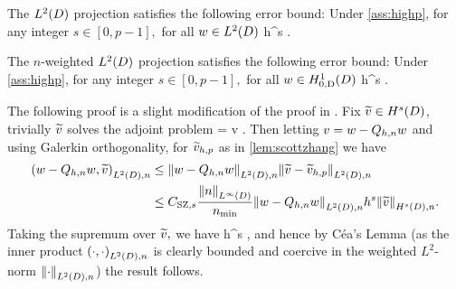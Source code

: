 




The $\LtD$ projection satisfies the following error bound:
\label{lem:ltdprojerr}
Under \cref{ass:highp}, for any integer $s \in [0,p-1],$ for all $w \in \LtD$
\beqs
{} \leq \Cmsz h^{s} .
\eeqs
\ele

The $n$-weighted $\LtD$ projection satisfies the following error bound:
\label{lem:wltdprojerr}
Under \cref{ass:highp}, for any integer $s \in [0,p-1],$ for all $w \in \HozDD$
\beq\label{eq:wltdprojerr}
 \leq {}  h^{s} .
\eeq
\ele

The following proof is a slight modification of the proof in \cite[Theorem 5.8.3]{BrSc:08}. Fix $\vtilde \in \HsD$, trivially $\widetilde{v}$ solves the adjoint problem
\beqs
{} =  \tforall v \in \LtD.
\eeqs
Then letting $v=w-Q_{h,n} w$ and using Galerkin orthogonality, for $\widetilde{v}_{h,p}$ as in \cref{lem:scottzhang} we have
\begin{align*}
\IPLtDn{w-\Qhn w}{\vtilde} &\leq \NLtDn{w-\Qhn w}\NLtDn{\vtilde-\vhptilde}\\
&\leq \CSZfn{s} \frac{\NLiD{n}}{\nmin}\NLtDn{w-\Qhn w} h^s \NHsDn{\vtilde}.
\end{align*}
Taking the supremum over $\widetilde{v},$ we have
\beqs
{} \leq {}  h^s ,
\eeqs
and hence by C\'ea's Lemma (as the inner product $\IPLtDn{\cdot}{\cdot}$ is clearly bounded and coercive in the weighted $L^2$-norm $\NLtDn{\cdot}$) the result follows.
\epf

